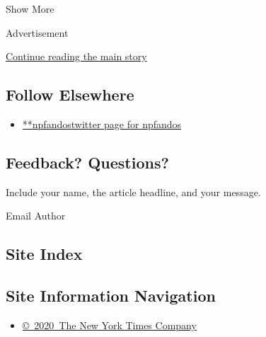 Show More

Advertisement

\protect\hyperlink{after-mid2}{Continue reading the main story}

\hypertarget{follow-elsewhere}{%
\subsection{Follow Elsewhere}\label{follow-elsewhere}}

\begin{itemize}
\tightlist
\item
  \href{https://twitter.com/npfandos}{**npfandostwitter page for
  npfandos}
\end{itemize}

\hypertarget{feedback-questions}{%
\subsection{Feedback? Questions?}\label{feedback-questions}}

Include your name, the article headline, and your message.

Email Author

\hypertarget{site-index}{%
\subsection{Site Index}\label{site-index}}

\hypertarget{site-information-navigation}{%
\subsection{Site Information
Navigation}\label{site-information-navigation}}

\begin{itemize}
\tightlist
\item
  \href{https://help.nytimes.com/hc/en-us/articles/115014792127-Copyright-notice}{©~2020~The
  New York Times Company}
\end{itemize}

